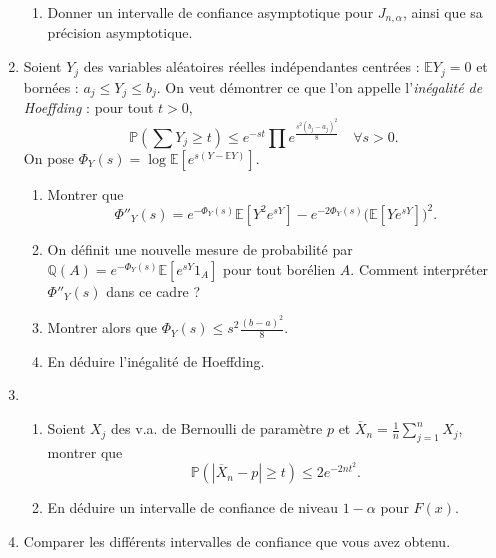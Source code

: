 \begin{enumerate}
\begin{enumerate}
	\item Donner un intervalle de confiance asymptotique pour $J_{n,\alpha}$, ainsi que sa précision asymptotique.
	\end{enumerate}
\item Soient $Y_j$ des variables aléatoires réelles indépendantes centrées : $\mathbb E Y_j = 0 $ et bornées : $a_j \leq Y_j \leq b_j$. On veut démontrer ce que l'on appelle l'\textit{inégalité de Hoeffding} : pour tout $t>0$, 
\[\mathbb P(\sum Y_j \geq t )\leq e^{-st}\prod e^{\frac{s^2(b_j-a_j)^2}{8}}\quad\forall s >0.\]
On pose $\Phi_Y(s)=\log \mathbb E[e^{s(Y-\mathbb E Y)}]$. 
	\begin{enumerate}
	\item Montrer que \[\Phi''_Y(s)=e^{-\Phi_Y(s)}\mathbb E[Y^2 e^{sY}]-e^{-2\Phi_Y(s)}\mathbb (\mathbb E[Ye^{sY}])^2.\]
	\item On définit une nouvelle mesure de probabilité par $\mathbb Q(A)= e^{-\Phi_Y(s)}\mathbb E[e^{sY}1_A]$ pour tout borélien $A$. Comment interpréter $ \Phi''_Y(s)$ dans ce cadre ?
	\item Montrer alors que $\Phi_Y(s)\leq s^2 \frac{(b-a)^2}{8}$.
	\item En déduire l'inégalité de Hoeffding.
	\end{enumerate}

\item \begin{enumerate}
	\item Soient $X_j$ des v.a. de Bernoulli de paramètre $p$ et $\overline X_n = \frac{1}{n}\sum_{j=1}^n X_j$, montrer que 
		\[\mathbb P(|\overline X_n-p|\geq t)\leq 2e^{-2nt^2}.\] 
	\item En déduire un intervalle de confiance de niveau $1-\alpha$ pour $F(x)$.
	\end{enumerate}
\item Comparer les différents intervalles de confiance que vous avez obtenu.
\end{enumerate}

